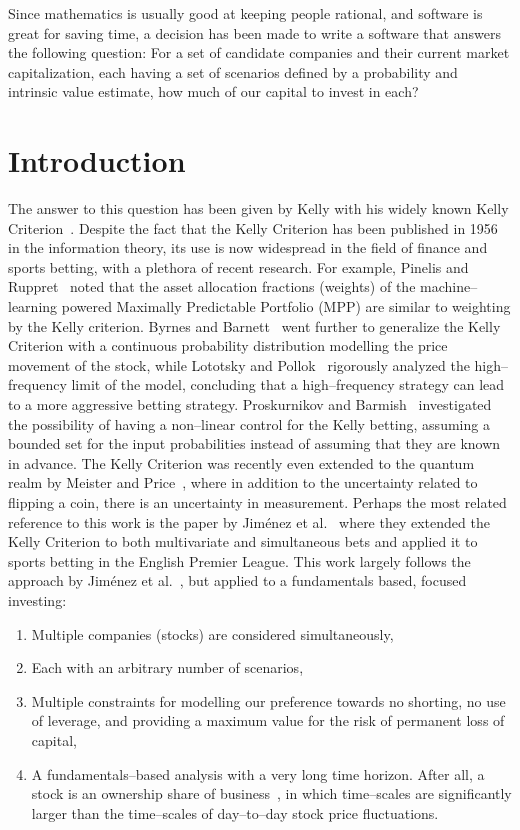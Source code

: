 \documentclass{article}
\begin{document}
Since mathematics is usually good at keeping people rational, and software is
great for saving time, a decision has been made to write a software that answers
the following question: For a set of candidate companies and their current
market capitalization, each having a set of scenarios defined by a probability
and intrinsic value estimate, how much of our capital to invest in each?

\section{Introduction}
\label{sec:introduction}

The answer to this question has been given by Kelly with his widely known Kelly
Criterion~\cite{kelly}. Despite the fact that the Kelly Criterion has been
published in 1956 in the information theory, its use is now widespread
in the field of finance and sports betting, with a plethora of recent research.
For example, Pinelis and Ruppret~\cite{pinelisRuppert} noted that the
asset allocation fractions (weights) of the machine--learning powered Maximally
Predictable Portfolio (MPP) are similar to weighting by the Kelly criterion.
Byrnes and Barnett~\cite{byrnesBarnett} went further to generalize the Kelly
Criterion with a continuous probability distribution modelling the price
movement of the stock, while Lototsky and Pollok~\cite{lototskyPollok}
rigorously analyzed the high--frequency limit of the model, concluding that a
high--frequency strategy can lead to a more aggressive betting strategy.
Proskurnikov and Barmish~\cite{proskurnikovBarmish} investigated the possibility
of having a non--linear control for the Kelly betting, assuming a bounded set
for the input probabilities instead of assuming that they are known in advance.
The Kelly Criterion was recently even extended to the quantum realm
by Meister and Price~\cite{meisterPrice}, where in addition to the uncertainty
related to flipping a coin, there is an uncertainty in measurement. Perhaps the
most related reference to this work is the paper by Jim\'{e}nez et
al.~\cite{jimenezEtAl} where they extended the Kelly Criterion to both
multivariate and simultaneous bets and applied it to sports betting in the
English Premier League. This work largely follows the approach by Jim\'{e}nez et
al.~\cite{jimenezEtAl}, but applied to a fundamentals based, focused investing:
\begin{enumerate}
    \item Multiple companies (stocks) are considered simultaneously,
    \item Each with an arbitrary number of scenarios,
    \item Multiple constraints for modelling our preference towards no shorting,
    no use of leverage, and providing a maximum value for the risk of permanent
    loss of capital,
    \item A fundamentals--based analysis with a very long time horizon. After
    all, a stock is an ownership share of business~\cite{intelligentInvestor},
    in which time--scales are significantly larger than the time--scales of
    day--to--day stock price fluctuations.
\end{enumerate}
\end{document}
